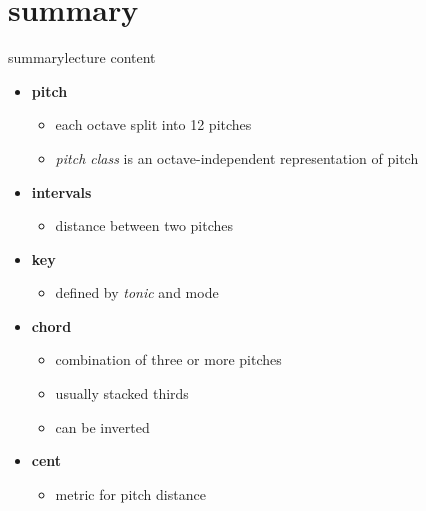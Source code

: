     \section{summary}
        \begin{frame}{summary}{lecture content}
            \begin{itemize}
                \item   \textbf{pitch}
                    \begin{itemize}
                        \item   each octave split into 12 pitches
                        \item   \textit{pitch class} is an octave-independent representation of pitch
                    \end{itemize}
                \smallskip
                \item   \textbf{intervals}
                    \begin{itemize}
                        \item   distance between two pitches
                    \end{itemize}
                \smallskip
                \item   \textbf{key}
                    \begin{itemize}
                        \item   defined by \textit{tonic} and mode
                    \end{itemize}
                \smallskip
                \item   \textbf{chord}
                    \begin{itemize}
                        \item   combination of three or more pitches
                        \item   usually stacked thirds
                        \item   can be inverted
                    \end{itemize}
                \smallskip
                \item   \textbf{cent}
                    \begin{itemize}
                        \item   metric for pitch distance
                    \end{itemize}
            \end{itemize}
        \end{frame}

